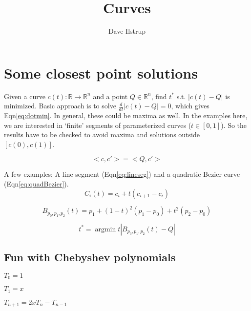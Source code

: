 \documentclass[12pt,letterpaper,oneside]{article}
\DeclareMathOperator*{\argmin}{argmin}
\begin{document}
\title{Curves}
\author{Dave Ilstrup}
\date{}
{\sf \maketitle}

\section{Some closest point solutions}

Given a curve $c(t):\mathbb{R}\rightarrow\mathbb{R}^n$
and a point $Q\in\mathbb{R}^n$, find $t^*$ s.t.
$|c(t)-Q|$ is minimized.
Basic approach is to solve $\frac{d}{dt}|c(t)-Q|=0$,
which gives Eqn\ref{eq:dotmin}. In general, these could be maxima
as well. In the examples here, we are interested in `finite' segments 
of parameterized curves ($t\in[0,1]$). So the results have to be checked
to avoid maxima and solutions outside $[c(0),c(1)]$.

\begin{equation}
\label{eq:dotmin}
<c,c'>=<Q,c'>
\end{equation}


A few examples: A line segment (Eqn\ref{eq:lineseg})
and a quadratic Bezier curve (Eqn\ref{eq:quadBezier}).
\begin{equation}
\label{eq:lineseg}
C_i(t) = c_i + t (c_{i+1}-c_i)
\end{equation}

\begin{equation}
\label{eq:quadBezier}
B_{p_0,p_1,p_2}(t) = p_1 + (1-t)^2(p_1-p_0) + t^2 (p_2-p_0)
\end{equation}


\begin{equation}
t^* = \argmin{t} |B_{p_0,p_1,p_2}(t)-Q|
\end{equation}


\subsection{Fun with Chebyshev polynomials}

$T_0 = 1$

$T_1 = x$

$T_{n+1} = 2xT_{n} - T_{n-1}$
\end{document}
